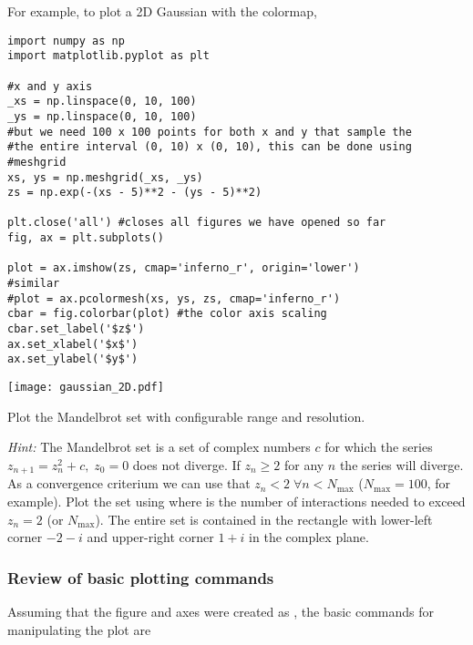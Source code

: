 For example, to plot a 2D Gaussian with the  colormap,
\begin{lstlisting}[caption=Two-dimensional plotting example.]
import numpy as np
import matplotlib.pyplot as plt

#x and y axis
_xs = np.linspace(0, 10, 100)
_ys = np.linspace(0, 10, 100)
#but we need 100 x 100 points for both x and y that sample the 
#the entire interval (0, 10) x (0, 10), this can be done using
#meshgrid
xs, ys = np.meshgrid(_xs, _ys)
zs = np.exp(-(xs - 5)**2 - (ys - 5)**2)

plt.close('all') #closes all figures we have opened so far
fig, ax = plt.subplots()

plot = ax.imshow(zs, cmap='inferno_r', origin='lower')
#similar
#plot = ax.pcolormesh(xs, ys, zs, cmap='inferno_r') 
cbar = fig.colorbar(plot) #the color axis scaling
cbar.set_label('$z$')
ax.set_xlabel('$x$')
ax.set_ylabel('$y$')
\end{lstlisting}
\begin{center}
    \texttt{[image: gaussian\_2D.pdf]}
\end{center}
\begin{exercise}
    Plot the Mandelbrot set with configurable range and resolution.

    \emph{Hint:} The Mandelbrot set is a set of complex numbers $c$ for which the series $z_{n+1} = z_n^2 + c,\; z_0 = 0$ does not diverge. If $z_n \geq 2$ for any $n$ the series will diverge. As a convergence criterium we can use that $z_n < 2\; \forall n < N_\mathrm{max}$ ($N_\mathrm{max} = 100$, for example). Plot the set using  where  is the number of interactions needed to exceed $z_n = 2$ (or $N_\mathrm{max}$). The entire set is contained in the rectangle with lower-left corner $-2-i$ and upper-right corner $1+i$ in the complex plane.
\end{exercise}

\subsubsection{Review of basic plotting commands}
Assuming that the figure and axes were created as , the basic commands for manipulating the plot are

